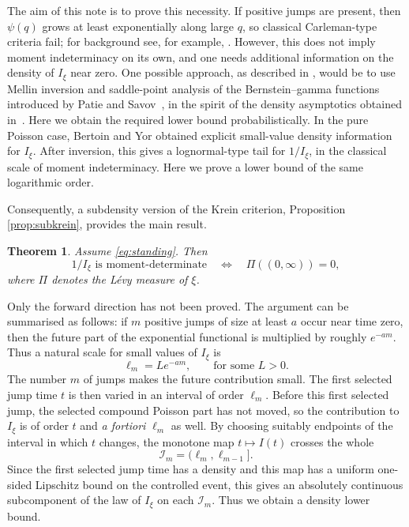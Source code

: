 \documentclass[10pt,a4paper]{amsart}
\newtheorem{theorem}{Theorem}[section]
\newcommand{\1}{\mathbf 1}
\begin{document}
The aim of this note is to prove this necessity. If positive jumps are present, then $\psi(q)$ grows at least exponentially along large $q$, so classical Carleman-type criteria fail; for background see, for example, \cite{Lin-2017,Stoyanov-Lin-Kopanov-2020}. However, this does not imply moment indeterminacy on its own, and one needs additional information on the density of $I_\xi$ near zero.
    One possible approach, as described in \cite[Remark 3.7]{Minchev-Savov-2026}, would be to use Mellin inversion and saddle-point analysis of the Bernstein--gamma functions introduced by Patie and Savov~\cite{Patie-Savov-2018}, in the spirit of the density asymptotics obtained in~\cite{Minchev-Savov-2023}. Here we obtain the required lower bound probabilistically.
   In the pure Poisson case, Bertoin and Yor \cite[Section~4]{Bertoin-Yor-2002} obtained explicit small-value density information for $I_\xi$. After inversion, this gives a lognormal-type tail for $1/I_\xi$, in the classical scale of moment indeterminacy. Here we prove a lower bound of the same logarithmic order.

Consequently, a subdensity version of the Krein criterion, Proposition \ref{prop:subkrein}, provides the main result. 


\begin{theorem}\label{thm:main}
Assume \eqref{eq:standing}. Then
\[
 1/I_\xi\text{ is moment-determinate}
 \quad\iff\quad
 \Pi((0,\infty))=0,
\]
where $\Pi$ denotes the Lévy measure of $\xi$.
\end{theorem}


Only the forward direction has not been proved. The argument can be summarised as follows: if $m$ positive jumps of size at least $a$ occur near time zero, then the future part of the exponential functional is multiplied by roughly $e^{-am}$. Thus a natural scale for small values of $I_\xi$ is \[
 \ell_m=L e^{-am},
 \qquad \text{for some $L>0$}.
\]
The number $m$ of jumps makes the future contribution small. The first selected jump time $t$ is then varied in an interval of order $\ell_m$. Before this first selected jump, the selected compound Poisson part has not moved, so the contribution to $I_\xi$ is of order $t$ and \textit{a fortiori} $\ell_m$ as well. By choosing  suitably endpoints of the interval in which $t$ changes, the monotone map $t\mapsto I(t)$ crosses the whole
\[
\mathcal I_m=(\ell_m,\ell_{m-1}].
\]
Since the first selected jump time has a density and this map has a uniform one-sided Lipschitz bound on the controlled event, this gives an absolutely continuous subcomponent of the law of $I_\xi$ on each $\mathcal I_m$. Thus we obtain a density lower bound.
\end{document}
